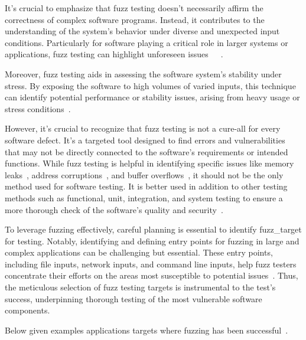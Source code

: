 It's crucial to emphasize that fuzz testing doesn't necessarily affirm the
correctness of complex software programs. Instead, it contributes to the
understanding of the system's behavior under diverse and unexpected input
conditions. Particularly for software playing a critical role in larger
systems or applications, fuzz testing can highlight unforeseen
issues~\cite{fuzzinga40:online}~\cite{demott2006evolving}~\cite{WhatisFu63:online}.

Moreover, fuzz testing aids in assessing the software system's stability under
stress. By exposing the software to high volumes of varied inputs, this
technique can identify potential performance or stability issues, arising
from heavy usage or stress conditions~\cite{demott2006evolving}.

However, it's crucial to recognize that fuzz testing is not a cure-all for every
software defect. It's a targeted tool designed to find errors and
vulnerabilities that may not be directly connected to the software's
requirements or intended functions. While fuzz testing is helpful in identifying
specific issues like memory leaks~\cite{shahriar2014testing},
address corruptions~\cite{muench2018you}, and
buffer overflows~\cite{godefroid2020fuzzing}, it should not be the only method
used for software testing. It is better used in addition to other testing
methods such as functional, unit, integration, and system testing to ensure a
more thorough check of the software's quality and
security~\cite{pietikainen2016steps}\cite{UnitTest25:online}\cite{WhatisFu63:online}.

To leverage fuzzing effectively, careful planning is essential to identify
\gls{fuzz_target} for testing. Notably, identifying and defining entry points
for fuzzing in large and complex applications can be challenging but essential.
These entry points, including file inputs, network inputs, and command
line inputs, help fuzz testers concentrate their efforts on the areas
most susceptible to potential issues~\cite{oehlert2005violating}.
Thus, the meticulous selection of
fuzz testing targets is instrumental to the test's success, underpinning
thorough testing of the most vulnerable software components.

Below given examples applications targets where fuzzing has been successful~\cite{fuzzingw44:online}.\label{par:target_categories}

